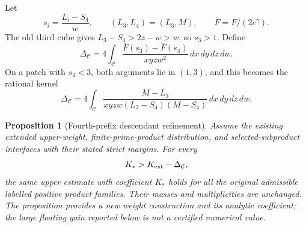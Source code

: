 \documentclass[11pt]{article}
\newtheorem{proposition}[theorem]{Proposition}
\begin{document}
Let
\[
 s_i=\frac{L_i-S_4}{w},\qquad (L_3,L_4)=(L_3,M),
 \qquad \overline F=F/(2e^\gamma).
\]
The old third cube gives \(L_3-S_4>2z-w>w\), so \(s_3>1\).
Define
\begin{equation}\label{eq:fourth-prefix-K-gain}
 \Delta_{\mathcal C}
 =4\int_{\mathcal C}
       \frac{\overline F(s_3)-\overline F(s_4)}
            {xyzw^2}\,dx\,dy\,dz\,dw.
\end{equation}
On a patch with \(s_4<3\), both arguments lie in \((1,3)\),
and this becomes the rational kernel
\begin{equation}\label{eq:fourth-prefix-K-rational-gain}
 \Delta_{\mathcal C}
 =4\int_{\mathcal C}
 \frac{M-L_3}{xyzw(L_3-S_4)(M-S_4)}\,dx\,dy\,dz\,dw.
\end{equation}

\begin{proposition}[Fourth-prefix descendant refinement]
\label{prop:fourth-prefix-descendant-refinement}
Assume the existing extended upper-weight, finite-prime-product
distribution, and selected-subproduct interfaces with their stated
strict margins. For every
\[
 K_*>K_{\rm ext}-\Delta_{\mathcal C},
\]
the same upper estimate with coefficient \(K_*\) holds for all the
original admissible labelled positive product families.
Their masses and multiplicities are unchanged.
The proposition provides a new weight construction and its analytic
coefficient; the large floating gain reported below is not a
certified numerical value.
\end{proposition}
\end{document}
